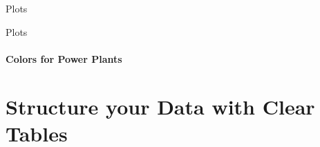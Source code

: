 \documentclass[aspectratio=169]{beamer}
\begin{document}
\begin{frame}{Plots}
\end{frame}


\begin{frame}{Plots}
    \framesubtitle{Colors for Power Plants}

    \begin{table}[htbp]
        \scalebox{0.94}{
            
        }
    \end{table}

\end{frame}


\section{\textbf{Structure} your \textbf{Data} with Clear \textbf{Tables}}

\begin{frame}
\end{frame}
\end{document}
